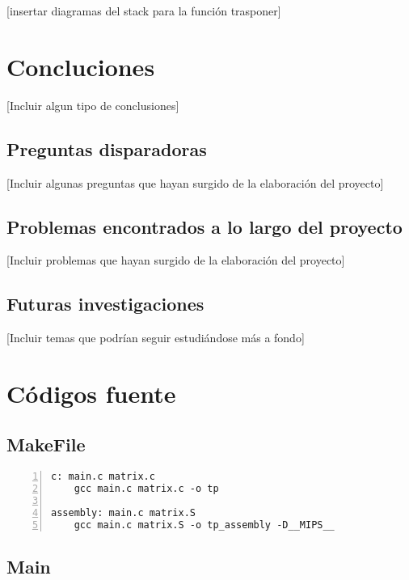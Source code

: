 \documentclass[11pt,a4paper]{article}
\begin{document}
[insertar diagramas del stack para la funci\'on trasponer]

\section{Concluciones}

[Incluir algun tipo de conclusiones]

\subsection{Preguntas disparadoras}

[Incluir algunas preguntas que hayan surgido de la elaboraci\'on del proyecto]

\subsection{Problemas encontrados a lo largo del proyecto}

[Incluir problemas que hayan surgido de la elaboraci\'on del proyecto]

\subsection{Futuras investigaciones}

[Incluir temas que podr\'ian seguir estudi\'andose m\'as a fondo]



\section{C\'odigos fuente}

\subsection{MakeFile}

\begin{lstlisting}[numbers=left, tabsize=2, basicstyle=\fontsize{11}{13}\ttfamily, frame=single, caption={makefile}]
c: main.c matrix.c
	gcc main.c matrix.c -o tp

assembly: main.c matrix.S
	gcc main.c matrix.S -o tp_assembly -D__MIPS__

\end{lstlisting}

\subsection{Main}
\end{document}
